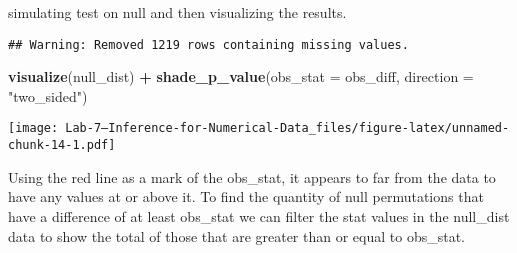 \documentclass[
]{article}
\newenvironment{Shaded}{\begin{snugshade}}{\end{snugshade}}
\newcommand{\DataTypeTok}[1]{\textcolor[rgb]{0.13,0.29,0.53}{#1}}
\newcommand{\DecValTok}[1]{\textcolor[rgb]{0.00,0.00,0.81}{#1}}
\newcommand{\KeywordTok}[1]{\textcolor[rgb]{0.13,0.29,0.53}{\textbf{#1}}}
\newcommand{\NormalTok}[1]{#1}
\newcommand{\OperatorTok}[1]{\textcolor[rgb]{0.81,0.36,0.00}{\textbf{#1}}}
\newcommand{\StringTok}[1]{\textcolor[rgb]{0.31,0.60,0.02}{#1}}
\begin{document}
simulating test on null and then visualizing the results.

\begin{Shaded}
\end{Shaded}

\begin{verbatim}
## Warning: Removed 1219 rows containing missing values.
\end{verbatim}

\begin{Shaded}
\begin{Highlighting}[]
\KeywordTok{visualize}\NormalTok{(null_dist) }\OperatorTok{+}\StringTok{ }
\StringTok{  }\KeywordTok{shade_p_value}\NormalTok{(}\DataTypeTok{obs_stat =}\NormalTok{ obs_diff, }\DataTypeTok{direction =} \StringTok{"two_sided"}\NormalTok{)}
\end{Highlighting}
\end{Shaded}

\texttt{[image: Lab-7---Inference-for-Numerical-Data\_files/figure-latex/unnamed-chunk-14-1.pdf]}

Using the red line as a mark of the obs\_stat, it appears to far from
the data to have any values at or above it. To find the quantity of null
permutations that have a difference of at least obs\_stat we can filter
the stat values in the null\_dist data to show the total of those that
are greater than or equal to obs\_stat.

\begin{Shaded}
\end{Shaded}
\end{document}
